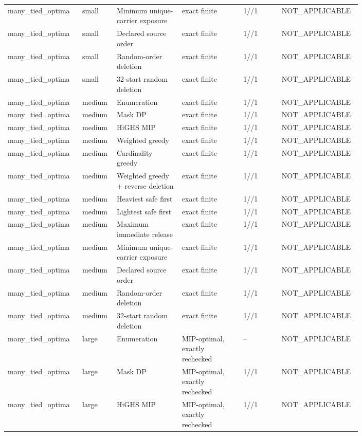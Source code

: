 {\begin{longtable}{p{0.18\linewidth}p{0.07\linewidth}p{0.17\linewidth}p{0.16\linewidth}p{0.10\linewidth}p{0.12\linewidth}}
many\_tied\_optima & small & Minimum unique-carrier exposure & exact finite & 1//1 & NOT\_APPLICABLE \\
many\_tied\_optima & small & Declared source order & exact finite & 1//1 & NOT\_APPLICABLE \\
many\_tied\_optima & small & Random-order deletion & exact finite & 1//1 & NOT\_APPLICABLE \\
many\_tied\_optima & small & 32-start random deletion & exact finite & 1//1 & NOT\_APPLICABLE \\
many\_tied\_optima & medium & Enumeration & exact finite & 1//1 & NOT\_APPLICABLE \\
many\_tied\_optima & medium & Mask DP & exact finite & 1//1 & NOT\_APPLICABLE \\
many\_tied\_optima & medium & HiGHS MIP & exact finite & 1//1 & NOT\_APPLICABLE \\
many\_tied\_optima & medium & Weighted greedy & exact finite & 1//1 & NOT\_APPLICABLE \\
many\_tied\_optima & medium & Cardinality greedy & exact finite & 1//1 & NOT\_APPLICABLE \\
many\_tied\_optima & medium & Weighted greedy + reverse deletion & exact finite & 1//1 & NOT\_APPLICABLE \\
many\_tied\_optima & medium & Heaviest safe first & exact finite & 1//1 & NOT\_APPLICABLE \\
many\_tied\_optima & medium & Lightest safe first & exact finite & 1//1 & NOT\_APPLICABLE \\
many\_tied\_optima & medium & Maximum immediate release & exact finite & 1//1 & NOT\_APPLICABLE \\
many\_tied\_optima & medium & Minimum unique-carrier exposure & exact finite & 1//1 & NOT\_APPLICABLE \\
many\_tied\_optima & medium & Declared source order & exact finite & 1//1 & NOT\_APPLICABLE \\
many\_tied\_optima & medium & Random-order deletion & exact finite & 1//1 & NOT\_APPLICABLE \\
many\_tied\_optima & medium & 32-start random deletion & exact finite & 1//1 & NOT\_APPLICABLE \\
many\_tied\_optima & large & Enumeration & MIP-optimal, exactly rechecked & -- & NOT\_APPLICABLE \\
many\_tied\_optima & large & Mask DP & MIP-optimal, exactly rechecked & 1//1 & NOT\_APPLICABLE \\
many\_tied\_optima & large & HiGHS MIP & MIP-optimal, exactly rechecked & 1//1 & NOT\_APPLICABLE \\

\end{longtable}}
